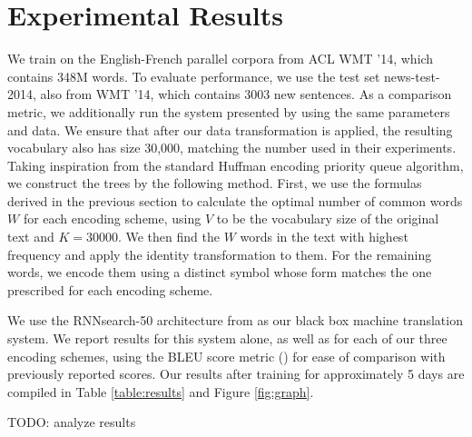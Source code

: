 \section{Experimental Results}
\label{sec:exp}

We train on the English-French parallel corpora from ACL WMT '14, which contains
348M words. To evaluate performance, we use the test set news-test-2014, also from
WMT '14, which contains 3003 new sentences. As a comparison metric, we additionally run the system presented by
 using the same parameters and data. We ensure
that after our data transformation is applied, the resulting vocabulary also has size
30,000, matching the number used in their experiments. Taking inspiration from the standard Huffman encoding
priority queue algorithm, we construct the trees by the following method. First, we use
the formulas derived in the previous section to calculate the optimal number of
common words $W$ for each encoding scheme, using $V$ to be the vocabulary size of the original text and $K = 30000$.
We then find the $W$ words in the text with highest frequency and
apply the identity transformation to them. For the remaining words, we encode them
using a distinct symbol whose form matches the one prescribed for each
encoding scheme.

We use the RNNsearch-50 architecture from  as
our black box machine translation system. We report results for this system alone,
as well as for each of our three encoding schemes, using the BLEU score metric () for
ease of comparison with previously reported scores. Our results after training
for approximately 5 days are compiled in Table \ref{table:results} and Figure \ref{fig:graph}.

TODO: analyze results

\begin{table}
  \centering
  \vspace{8pt}
  \caption{BLEU scores on detokenized test set for various encoding
    schemes after training for 5 days.}
  \label{table:results}
\end{table}

